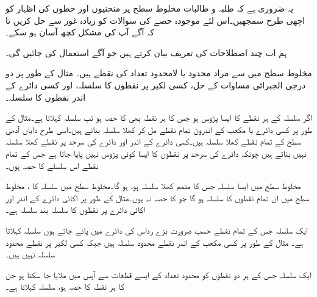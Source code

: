 یہ ضروری ہے کہ طلبہ و طالبات مخلوط سطح پر منحنیوں اور خطوں کی اظہار کو اچھی طرح سمجھیں۔اس لئے موجودہ حصے کی سوالات کو زیادہ غور سے حل کریں تا کہ آگے آپ کی مشکل کچھ آسان ہو سکے۔

ہم اب چند اصطلاحات کی تعریف  بیان کرتے ہیں جو آگے استعمال کی جائیں گی۔

مخلوط سطح میں  سے مراد محدود یا لامحدود تعداد کی نقطے ہیں۔  مثال کے طور پر دو درجی الجبرائی مساوات کے حل، کسی لکیر پر نقطوں کا سلسلہ، اور کسی دائرے کے اندر نقطوں کا سلسلہ۔

اگر سلسلہ  کے ہر نقطے کا ایسا پڑوس ہو جس کا ہر نقطہ بھی  کا حصہ ہو تب   سلسلہ  کہلاتا ہے۔مثال کے طور پر کسی دائرے یا مکعب کے اندرون تمام نقطے  مل کر کھلا سلسلہ بناتے ہیں۔اسی طرح دایاں آدھی سطح  کے تمام نقطے کھلا سلسلہ ہیں۔کسی دائرے کے اندر اور دائرے کی سرحد پر نقطے  کھلا سلسلہ نہیں بناتے ہیں چونکہ دائرے کی سرحد پر نقطوں کا ایسا کوئی پڑوس نہیں پایا جاتا ہے جس کے تمام نقطے اس سلسلے کا حصہ ہوں۔

 مخلوط سطح میں ایسا سلسلہ جس کا متمم کھلا سلسلہ ہو،  ہو گا۔مخلوط سطح میں سلسلہ  کا ، مخلوط سطح میں ان تمام نقطوں کا سلسلہ ہو گا جو  کا حصہ نہ ہوں۔مثال کے طور پر اکائی دائرے کے اندر اور اکائی دائرے پر نقطوں کا سلسلہ بند سلسلہ ہے۔

ایک سلسلہ جس کے تمام نقطے حسب ضرورت بڑے رداس کی دائرے میں پائے جاتے ہوں  سلسلہ کہلاتا ہے۔ مثال کے طور پر کسی مکعب کے اندر نقطے محدود سلسلہ ہیں جبکہ کسی لکیر پر نقطے محدود سلسلہ نہیں ہیں۔

ایک سلسلہ  جس کے ہر دو نقطوں کو محدود تعداد کے ایسے قطعات سے آپس میں ملایا جا سکتا ہو جن کا ہر نقطہ  کا حصہ ہو،  سلسلہ کہلاتا ہے۔
